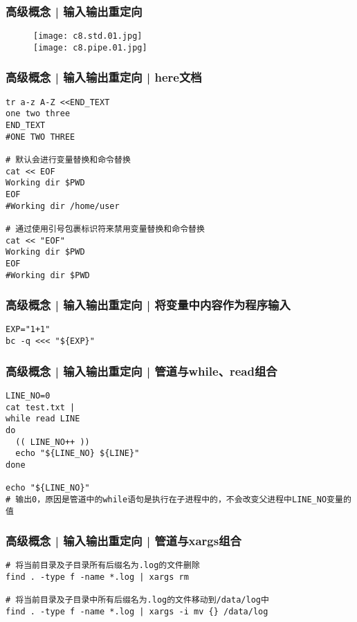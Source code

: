 \begin{frame}
  \frametitle{高级概念 | 输入输出重定向}
  \begin{figure}
    \centering
    \texttt{[image: c8.std.01.jpg]}\\
    \texttt{[image: c8.pipe.01.jpg]}
  \end{figure}
\end{frame}

\begin{frame}[fragile]
  \frametitle{高级概念 | 输入输出重定向 | here文档}
\begin{lstlisting}
tr a-z A-Z <<END_TEXT
one two three
END_TEXT
#ONE TWO THREE

# 默认会进行变量替换和命令替换
cat << EOF
Working dir $PWD
EOF
#Working dir /home/user

# 通过使用引号包裹标识符来禁用变量替换和命令替换
cat << "EOF"
Working dir $PWD
EOF
#Working dir $PWD
\end{lstlisting}
\end{frame}

\begin{frame}[fragile]
  \frametitle{高级概念 | 输入输出重定向 | 将变量中内容作为程序输入}
\begin{lstlisting}
EXP="1+1"
bc -q <<< "${EXP}"
\end{lstlisting}
\end{frame}

\begin{frame}[fragile]
  \frametitle{高级概念 | 输入输出重定向 | 管道与while、read组合}
\begin{lstlisting}
LINE_NO=0
cat test.txt | 
while read LINE
do
  (( LINE_NO++ ))
  echo "${LINE_NO} ${LINE}"
done

echo "${LINE_NO}"
# 输出0，原因是管道中的while语句是执行在子进程中的，不会改变父进程中LINE_NO变量的值
\end{lstlisting}
\end{frame}

\begin{frame}[fragile]
  \frametitle{高级概念 | 输入输出重定向 | 管道与xargs组合}
\begin{lstlisting}
# 将当前目录及子目录所有后缀名为.log的文件删除
find . -type f -name *.log | xargs rm

# 将当前目录及子目录中所有后缀名为.log的文件移动到/data/log中
find . -type f -name *.log | xargs -i mv {} /data/log
\end{lstlisting}
\end{frame}

